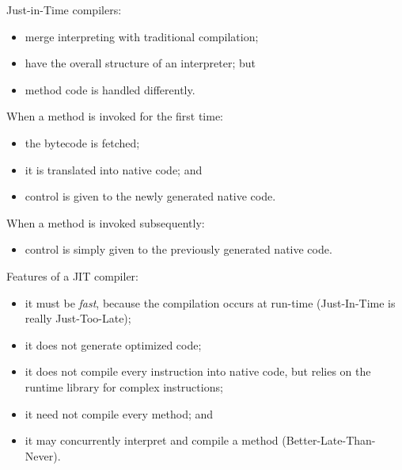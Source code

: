 \begin{slide*}
Just-in-Time compilers:

\begin{itemize}
\item merge interpreting with traditional compilation;
\item have the overall structure of an interpreter; but
\item method code is handled differently.
\end{itemize}
\vspace*{1em}

When a method is invoked for the first time:
\begin{itemize}
\item the bytecode is fetched;
\item it is translated into native code; and
\item control is given to the newly generated native code.
\end{itemize}
When a method is invoked subsequently:
\begin{itemize}
\item control is simply given to the previously generated native code.
\end{itemize}

\vfil
\end{slide*}
 
\begin{slide*}
Features of a JIT compiler:\\
\begin{itemize}
\item it must be {\em fast}, because the compilation occurs
      at run-time (Just-In-Time is really Just-Too-Late);
\item it does not generate optimized code;
\item it does not compile every instruction into native code, but relies on the
runtime library for complex instructions;
\item it need not compile every method; and
\item it may concurrently interpret and compile a method (Better-Late-Than-Never).
\end{itemize}
\vfil
\end{slide*}
 
